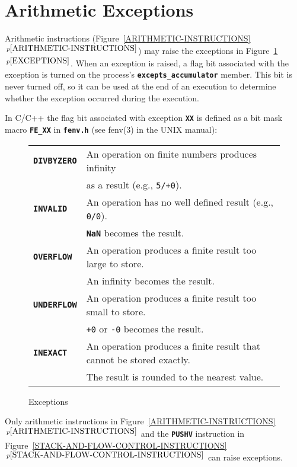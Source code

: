 \documentclass[12pt]{article}
\makeatletter
\newcommand{\TT}[1]{{\tt \bfseries #1}}
\newcommand{\ttkey}[1]{\TT{#1}\index{#1@{\tt #1}}}
\newcommand{\itemref}[1]{\ref{#1}$\,^{p\pageref{#1}}$}
\newcommand{\EOL}{\penalty \exhyphenpenalty}
\newlength{\figurewidth}
\newenvironment{boxedfigure}[1][!btp]%
	{\begin{figure*}[#1]
	 \begin{lrbox}{\figurebox}
	 \begin{minipage}{\figurewidth}

	 \vspace*{1ex}}%
	{
	 \vspace*{1ex}

	 \end{minipage}
	 \end{lrbox}

	 \centering
	 \fbox{\hspace*{0.1in}\usebox{\figurebox}\hspace*{0.1in}}
	 \end{figure*}}
\makeatother
\begin{document}
\section{Arithmetic Exceptions}
\label{ARITHMETIC-EXCEPTIONS}

Arithmetic instructions (Figure~\itemref{ARITHMETIC-INSTRUCTIONS})
may raise the exceptions in Figure~\itemref{EXCEPTIONS}.
When an exception is raised, a flag bit associated with the
exception is turned on the process's \TT{excepts\_\EOL accumulator}
member.  This bit is never turned off, so it can be used at the
end of an execution to determine whether the exception
occurred during the execution.

In C/C++ the flag bit associated with exception \TT{XX}
is defined as a bit mask macro \TT{FE\_XX} in \TT{fenv.h}
(see fenv(3) in the UNIX manual):

\begin{boxedfigure}[t!]
\begin{center}
\begin{tabular}{|l|l|}
\hline
\ttkey{DIVBYZERO} &  An operation on finite numbers produces infinity \\
                  &  as a result (e.g., {\tt 5/+0}).
\\\hline
\ttkey{INVALID} & An operation has no well defined result
                  (e.g., {\tt 0/0}). \\
		& \TT{NaN} becomes the result.
\\\hline
\ttkey{OVERFLOW} & An operation produces a finite result too large to
                   store. \\
		 & An infinity becomes the result.
\\\hline
\ttkey{UNDERFLOW} & An operation produces a finite result too small to
                    store. \\
	          & {\tt +0} or {\tt -0} becomes the result.
\\\hline
\ttkey{INEXACT} & An operation produces a finite result that cannot
                  be stored exactly. \\
		& The result is rounded to the nearest value.
\\\hline
\end{tabular}
\end{center}
\caption{Exceptions}
\label{EXCEPTIONS}
\end{boxedfigure}

Only arithmetic instructions in Figure~\itemref{ARITHMETIC-INSTRUCTIONS}
and the \TT{PUSHV} instruction in
Figure~\itemref{STACK-AND-FLOW-CONTROL-INSTRUCTIONS} can raise
exceptions.
\end{document}
